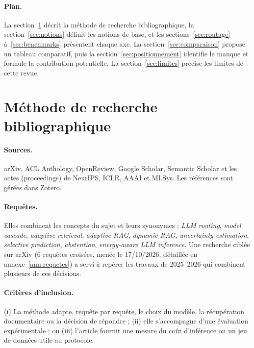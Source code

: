 \documentclass[11pt,a4paper]{article}
\begin{document}
\paragraph{Plan.} La section~\ref{sec:methode} décrit la méthode de recherche bibliographique, la
section~\ref{sec:notions} définit les notions de base, et les sections~\ref{sec:routage}
à~\ref{sec:benchmarks} présentent chaque axe. La section~\ref{sec:comparaison} propose un tableau
comparatif, puis la section~\ref{sec:positionnement} identifie le manque et formule la contribution
potentielle. La section~\ref{sec:limites} précise les limites de cette revue.

\section{Méthode de recherche bibliographique}\label{sec:methode}

\paragraph{Sources.} arXiv, ACL Anthology, OpenReview, Google Scholar, Semantic Scholar et les actes
(proceedings) de NeurIPS, ICLR, AAAI et MLSys. Les références sont gérées dans Zotero.

\paragraph{Requêtes.} Elles combinent les concepts du sujet et leurs synonymes : \textit{LLM routing},
\textit{model cascade}, \textit{adaptive retrieval}, \textit{adaptive RAG}, \textit{dynamic RAG},
\textit{uncertainty estimation}, \textit{selective prediction}, \textit{abstention},
\textit{energy-aware LLM inference}. Une recherche ciblée sur arXiv (6 requêtes croisées, menée le
17/10/2026, détaillée en annexe~\ref{ann:requetes}) a servi à repérer les travaux de 2025--2026 qui
combinent plusieurs de ces décisions.

\paragraph{Critères d'inclusion.} (i) La méthode adapte, requête par requête, le choix du modèle, la
récupération documentaire ou la décision de répondre ; (ii) elle s'accompagne d'une évaluation
expérimentale ; ou (iii) l'article fournit une mesure du coût d'inférence ou un jeu de données utile
au protocole.
\end{document}
